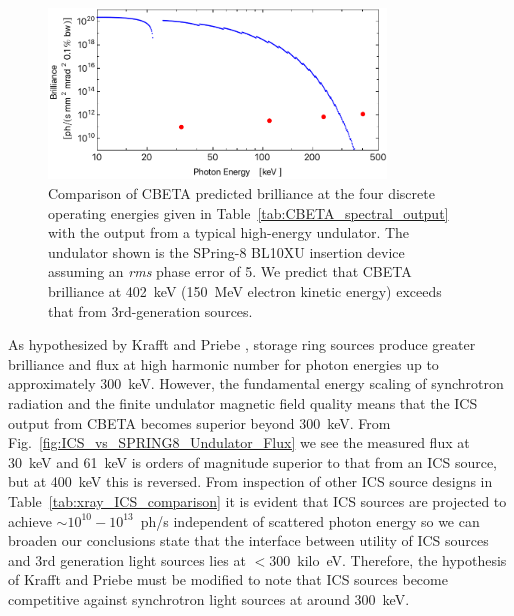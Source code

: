 \documentclass[../main.tex]{subfiles}
\begin{document}
\begin{figure}[!h]
\centering
\includegraphics[width=0.8\textwidth]{Figures/CBETA_Inverse_Compton_Source_Design/spring8bl10brillianceplot.pdf}
\caption{Comparison of CBETA predicted brilliance at the four discrete operating energies given in Table~\ref{tab:CBETA_spectral_output} with the output from a typical high-energy undulator. The undulator shown is the SPring-8 BL10XU insertion device~\cite{spring8beamlines} assuming an \textit{rms} phase error of 5\si{\degrees}. We predict that CBETA brilliance at 402~\si{\kilo\electronvolt} (150~\si{\mega\electronvolt} electron kinetic energy) exceeds that from 3rd-generation sources.}
\label{fig:ICS_vs_SPRING8_Undulator_Brilliance}
\end{figure}

As hypothesized by Krafft and Priebe \cite{krafft2010compton}, storage ring sources produce greater brilliance and flux at high harmonic number for photon energies up to approximately 300~\si{\kilo\electronvolt}. However, the fundamental energy scaling of synchrotron radiation and the finite undulator magnetic field quality means that the ICS output from CBETA becomes superior beyond 300~\si{\kilo\electronvolt}. From Fig.~\ref{fig:ICS_vs_SPRING8_Undulator_Flux} we see the measured flux at 30~\si{\kilo\electronvolt} and 61~\si{\kilo\electronvolt} \cite{spring8beamlines} is orders of magnitude superior to that from an ICS source, but at 400~\si{\kilo\electronvolt} this is reversed. From inspection of other ICS source designs in Table~\ref{tab:xray_ICS_comparison} it is evident that ICS sources are projected to achieve $\sim 10^{10} - 10^{13}$~ph/\si{\second} independent of scattered photon energy so we can broaden our conclusions state that the interface between utility of ICS sources and 3rd generation light sources lies at $< 300$~\si{kilo\electronvolt}. Therefore, the hypothesis of Krafft and Priebe \cite{krafft2010compton} must be modified to note that ICS sources become competitive against synchrotron light sources at around 300~\si{\kilo\electronvolt}.  
\end{document}
